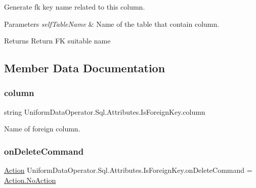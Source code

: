 Generate fk key name related to this column. 


\begin{DoxyParams}{Parameters}
{\em self\+Table\+Name} & Name of the table that contain column.\\
\hline
\end{DoxyParams}
\begin{DoxyReturn}{Returns}
Return FK suitable name
\end{DoxyReturn}


\subsection{Member Data Documentation}
\mbox{\label{class_uniform_data_operator_1_1_sql_1_1_attributes_1_1_is_foreign_key_a8d14eef86991a9e1a187876626cbb70b}} 
\subsubsection{\texorpdfstring{column}{column}}
{\footnotesize\ttfamily string Uniform\+Data\+Operator.\+Sql.\+Attributes.\+Is\+Foreign\+Key.\+column}



Name of foreign column. 

\mbox{\label{class_uniform_data_operator_1_1_sql_1_1_attributes_1_1_is_foreign_key_af70b31f4805f136d6a32b1fa33d9bbf6}} 
\subsubsection{\texorpdfstring{on\+Delete\+Command}{onDeleteCommand}}
{\footnotesize\ttfamily \mbox{\hyperlink{class_uniform_data_operator_1_1_sql_1_1_attributes_1_1_is_foreign_key_a6039622384e2bbd1aa386e326ee0f850}{Action}} Uniform\+Data\+Operator.\+Sql.\+Attributes.\+Is\+Foreign\+Key.\+on\+Delete\+Command = \mbox{\hyperlink{class_uniform_data_operator_1_1_sql_1_1_attributes_1_1_is_foreign_key_a6039622384e2bbd1aa386e326ee0f850a1e601ea653db1c729c9ee5746730fabe}{Action.\+No\+Action}}}



